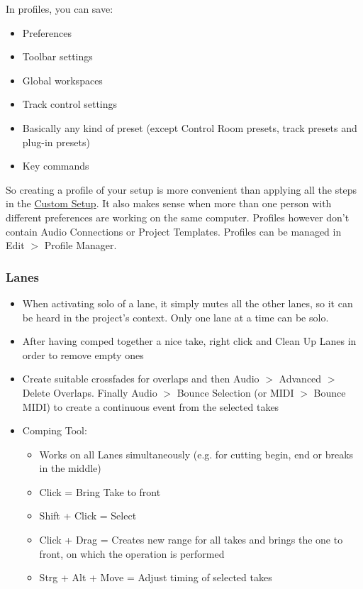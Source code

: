 \documentclass[10pt]{article}
\begin{document}
In profiles, you can save:
\begin{itemize}
	\item Preferences
	\item Toolbar settings
	\item Global workspaces
	\item Track control settings
	\item Basically any kind of preset (except Control Room presets, track presets and plug-in presets)
	\item Key commands
\end{itemize}
So creating a profile of your setup is more convenient than applying all the steps in the \hyperlink{CustomSetup}{Custom Setup}. It also makes sense when more than one person with different preferences are working on the same computer. Profiles however don't contain Audio Connections or Project Templates. Profiles can be managed in Edit $>$ Profile Manager.

\subsubsection{Lanes}

\begin{itemize}
	\item When activating solo of a lane, it simply mutes all the other lanes, so it can be heard in the project's context. Only one lane at a time can be solo.
	\item After having comped together a nice take, right click and Clean Up Lanes in order to remove empty ones
	\item Create suitable crossfades for overlaps and then Audio $>$ Advanced $>$ Delete Overlaps. Finally Audio $>$ Bounce Selection (or MIDI $>$ Bounce MIDI) to create a continuous event from the selected takes
	\item Comping Tool:
	\begin{itemize}
		\item Works on all Lanes simultaneously (e.g. for cutting begin, end or breaks in the middle)
		\item Click = Bring Take to front
		\item Shift + Click = Select
		\item Click + Drag = Creates new range for all takes and brings the one to front, on which the operation is performed
		\item Strg + Alt + Move = Adjust timing of selected takes
	\end{itemize}
\end{itemize}
\end{document}
